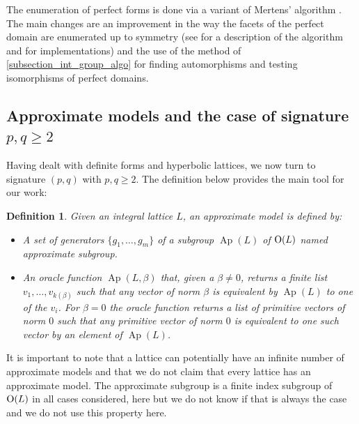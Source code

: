 \documentclass[a4paper,11pt]{article}
\newtheorem{definition}[lemma]{Definition}
\newcommand{\Orth}{\mathop{\null\mathrm {O}}\nolimits}
\newcommand{\Ap}{\mathop{\mathrm {Ap}}\nolimits}
\begin{document}
The enumeration of perfect forms is done via a variant of Mertens' algorithm \cite{Mertens}.
The main changes are an improvement in the way the facets of the perfect domain are enumerated
up to symmetry (see \cite{highlysymmetric} for a description of the algorithm and
\cite{Polyhedral} for implementations) and the use of the method of \ref{subsection_int_group_algo}
for finding automorphisms and testing isomorphisms of perfect domains.

\subsection{Approximate models and the case of signature $p,q\geq 2$}\label{subsection_approximatemodels}

Having dealt with definite forms and hyperbolic lattices, we now turn to signature $(p,q)$ with $p,q \geq 2$.
The definition below provides the main tool for our work:

\begin{definition}
Given an integral lattice $L$, an {\em approximate model} is defined by:
\begin{itemize}
\item A set of generators $\{g_1, \dots, g_m\}$ of a subgroup $\Ap(L)$
of $\Orth(L)$ named {\em approximate subgroup}.
\item An {\em oracle function} $\Ap(L,\beta)$ that, given a $\beta \not=0$, returns
a finite list $v_1, \dots, v_{k(\beta)}$ such that any vector of norm $\beta$
is equivalent by $\Ap(L)$ to one of the $v_i$.
For $\beta = 0$ the oracle function returns a list of primitive vectors of norm $0$ such that
any primitive vector of norm $0$ is equivalent to one such vector by an element of $\Ap(L)$.
\end{itemize}
\end{definition}
It is important to note that a lattice can potentially have an infinite number of approximate models
and that we do not claim that every lattice has an approximate model. The approximate subgroup is
a finite index subgroup of $\Orth(L)$ in all cases considered, here but we do not know if that
is always the case and we do not use this property here.
\end{document}
